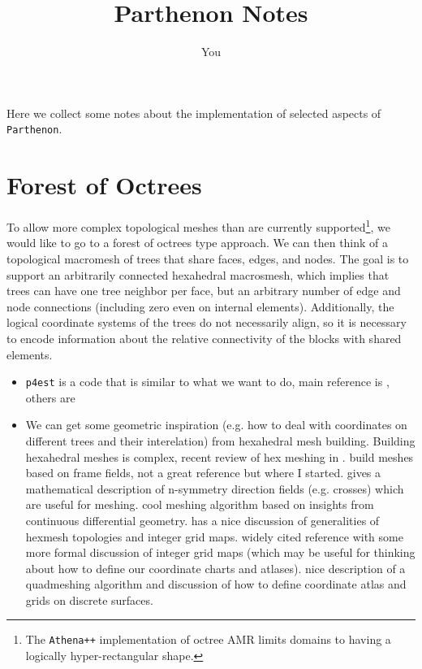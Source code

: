\documentclass{article}
\title{Parthenon Notes}
\author{You}
\begin{document}
\maketitle

Here we collect some notes about the implementation of selected aspects of \texttt{Parthenon}.
\tableofcontents 

\section{Forest of Octrees} 

To allow more complex topological meshes than are currently supported\footnote{The \texttt{Athena++} implementation  of octree AMR limits domains to having a logically hyper-rectangular shape.}, we would like to go to a forest of octrees type approach. We can then think of a topological macromesh of trees that share faces, edges, and nodes. The goal is to support an arbitrarily connected hexahedral macrosmesh, which implies that trees can have one tree neighbor per face, but an arbitrary number of edge and node connections (including zero even on internal elements). Additionally, the logical coordinate systems of the trees do not necessarily align, so it is necessary to encode information about the relative connectivity of the blocks with shared elements. 

\begin{itemize}
    \item \texttt{p4est} is a code that is similar to what we want to do, main reference is \cite{Burstedde:2011}, others are \cite{Isaac:2015, Burstedde:2020}
    \item We can get some geometric inspiration (e.g. how to deal with coordinates on different trees and their interelation) from hexahedral mesh building. Building hexahedral meshes is complex, recent review of hex meshing in \cite{Pietroni:2022}. \cite{Kowalski:2014} build meshes based on frame fields, not a great reference but where I started. \cite{Ray:2008} gives a mathematical description of n-symmetry direction fields (e.g. crosses) which are useful for meshing. \cite{Corman:2019} cool meshing algorithm based on insights from continuous differential geometry. \cite{Liu:2018} has a nice discussion of generalities of hexmesh topologies and integer grid maps. \cite{Bommes:2013} widely cited reference with some more formal discussion of integer grid maps (which may be useful for thinking about how to define our coordinate charts and atlases). \cite{Kalberer:2007} nice description of a quadmeshing algorithm and discussion of how to define coordinate atlas and grids on discrete surfaces. 
\end{itemize}
\end{document}
